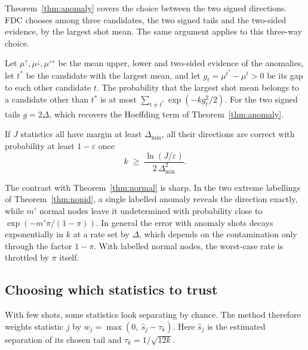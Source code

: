 Theorem~\ref{thm:anomaly} covers the choice between the two signed directions. FDC chooses among three candidates, the two signed tails and the two-sided evidence, by the largest shot mean. The same argument applies to this three-way choice.

\begin{corollary}\label{cor:three}
Let $\mu^{\uparrow}, \mu^{\downarrow}, \mu^{\leftrightarrow}$ be the mean upper, lower and two-sided evidence of the anomalies, let $t^{*}$ be the candidate with the largest mean, and let $g_t = \mu^{t^*} - \mu^{t} > 0$ be its gap to each other candidate $t$. The probability that the largest shot mean belongs to a candidate other than $t^*$ is at most $\sum_{t \ne t^*} \exp(-k g_t^2/2)$. For the two signed tails $g = 2\Delta$, which recovers the Hoeffding term of Theorem~\ref{thm:anomaly}.
\end{corollary}

\begin{corollary}\label{cor:k}
If $J$ statistics all have margin at least $\Delta_{\min}$, all their directions are correct with probability at least $1-\varepsilon$ once
\[
k \;\ge\; \frac{\ln(J/\varepsilon)}{2\,\Delta_{\min}^{2}}.
\]
\end{corollary}

The contrast with Theorem~\ref{thm:normal} is sharp. In the two extreme labellings of Theorem~\ref{thm:nonid}, a single labelled anomaly reveals the direction exactly, while $m'$ normal nodes leave it undetermined with probability close to $\exp(-m'\pi/(1-\pi))$. In general the error with anomaly shots decays exponentially in $k$ at a rate set by $\Delta$, which depends on the contamination only through the factor $1-\pi$. With labelled normal nodes, the worst-case rate is throttled by $\pi$ itself.

\subsection{Choosing which statistics to trust}

With few shots, some statistics look separating by chance. The method therefore weights statistic $j$ by $w_j = \max(0,\ \hat s_j - \tau_k)$. Here $\hat s_j$ is the estimated separation of its chosen tail and $\tau_k = 1/\sqrt{12k}$.

